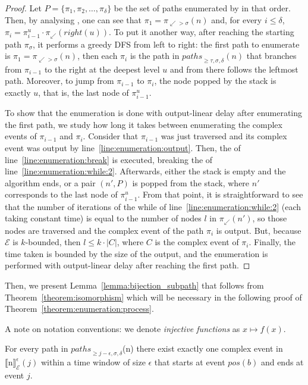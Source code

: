 \begin{proof}
  Let $P = \{\pi_{1}, \pi_{2}, \ldots, \pi_{\delta}\}$ be the set of paths enumerated by  in that order. Then, by analysing , one can see that $\pi_{1} = \pi_{\swarrow > \sigma}(n)$ and, for every $i \le \delta$, $\pi_{i} = \pi^{u}_{i-1} \cdot \pi_{\swarrow}(right(u))$. To put it another way, after reaching the starting path $\pi_{\sigma}$, it performs a greedy DFS from left to right: the first path to enumerate is $\pi_{1} = \pi_{\swarrow > \sigma}(n)$, then each $\pi_{i}$ is the path in ${paths}_{\ge \tau, \sigma, \delta}(n)$ that branches from $\pi_{i-1}$ to the right at the deepest level $u$ and from there follows the leftmost path. Moreover, to jump from $\pi_{i-1}$ to $\pi_{i}$, the node popped by the stack is exactly $u$, that is, the last node of $\pi^{u}_{i-1}$.

  To show that the enumeration is done with output-linear delay after enumerating the first path, we study how long it takes between enumerating the complex events of $\pi_{i-1}$ and $\pi_{i}$. Consider that $\pi_{i-1}$ was just traversed and its complex event was output by line~\ref{line:enumeration:output}. Then, the  of line~\ref{line:enumeration:break} is executed, breaking the  of line~\ref{line:enumeration:while:2}. Afterwards, either the stack is empty and the algorithm ends, or a pair $(n', P)$ is popped from the stack, where $n'$ corresponds to the last node of $\pi^{u}_{i-1}$. From that point, it is straightforward to see that the number of iterations of the while of line~\ref{line:enumeration:while:2} (each taking constant time) is equal to the number of nodes $l$ in $\pi_{\swarrow}(n')$, so those nodes are traversed and the complex event of the path $\pi_{i}$ is output. But, because $\mathcal{E}$ is $k$-bounded, then $l \le k \cdot |C|$, where $C$ is the complex event of $\pi_{i}$. Finally, the time taken is bounded by the size of the output, and the enumeration is performed with output-linear delay after reaching the first path.
\end{proof}

Then, we present Lemma~\ref{lemma:bijection_subpath} that follows from Theorem~\ref{theorem:isomorphism} which will be necessary in the following proof of Theorem~\ref{theorem:enumeration:process}.

A note on notation conventions: we denote \emph{injective functions} as $x \mapsto f(x)$.

\begin{lemma}\label{lemma:bijection_subpath}
  For every path in ${paths}_{\ge j-\epsilon, \sigma, \delta}$(n) there exist exactly one complex event in ${\llbracket \text{n} \rrbracket}^{\epsilon}_{\mathcal{E}}(j)$ within a time window of size $\epsilon$ that starts at event $pos(b)$ and ends at event $j$.
\end{lemma}

